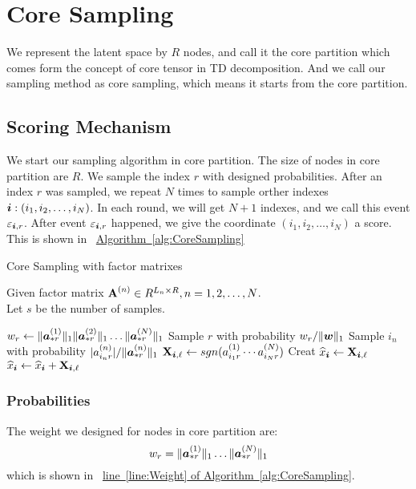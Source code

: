 \documentclass[letterpaper]{article}
\newcommand{\Sca}[3]{{#1}^{(#2)}_{i_#2#3}}%
\newcommand{\V}[1]{{\bm{{\MakeLowercase{#1}}}}}
\newcommand{\VnC}[3]{\V{#1}^{(#2)}_{#3}}
\newcommand{\Nrocl}[2]{\norm{\VnC{a}{#1}{*#2}}{1}}
\newcommand{\Vacol}[1]{\V{a}^{(#1)}_{*r}}
\newcommand{\M}[1]{{\bm{\mathbf{\MakeUppercase{#1}}}}}
\newcommand{\norm}[2]{\|#1\|_{#2}}
\newcommand{\Alg}[1] {\hyperref[alg:#1] {Algorithm~\ref*{alg:#1}}}
\newcommand{\AlgLine}[2]{\hyperref[alg:#1]{line~\ref*{line:#2} of Algorithm~\ref*{alg:#1}}}
\newcommand{\Coord}{(i_1,i_2,\ldots,i_N)}
\newcommand{\WreightR}{\Nrocl{1}{r}\ldots\Nrocl{N}{r}}
\begin{document}
\section{Core Sampling}
We represent the latent space by $R$ nodes, 
and call it the core partition which comes form the concept of core tensor in TD decomposition.
And we call our sampling method as core sampling, which means it starts from the core partition.

\subsection{Scoring Mechanism}

We start our sampling algorithm in core partition.
The size of nodes in core partition are $R$.
We sample the index $r$ with designed probabilities.
After an index $r$ was sampled, we repeat $N$ times to sample orther indexes $\V{i}:\Coord$.
In each round, we will get $N+1$ indexes, and we call this event $\varepsilon_{\V{i},r}$.
After event $\varepsilon_{\V{i},r}$ happened, we give the coordinate $\Coord$ a score.
This is shown in ~\Alg{CoreSampling}

\begin{algorithm}[t]
    \caption{Core Sampling with factor matrixes}
    \label{alg:CoreSampling}
    Given factor matrix $\M{A}^{(n)}\in R^{L_n\times R}, n = 1,2,\ldots,N$.\\
    Let $s$ be the number of samples.
    \begin{algorithmic}[1]
    \State $w_r \leftarrow \Nrocl{1}{r}\norm{\Vacol{2}}{1}\ldots\Nrocl{N}{r}$
    \label{line:Weight}
    \EndFor
    \State Sample $r$ with probability $w_r/\norm{\V{W}}{1}$
    \label{line:CorePartition}
    \label{line:ItemPartitionFor}
    \State Sample $i_n$ with probability $|\Sca{a}{n}{r}|/\norm{\Vacol{n}}{1}$
    \EndFor
    \label{line:ItemPartitionEnd}
    \State 
    \label{line:Scoring}
        $\M{X}_{\V{i},\ell} \leftarrow sgn(\Sca{a}{1}{r}\cdots\Sca{a}{N}{r})$
    \If {$\V{i}=\Coord$ has not been sampled}
    \State  Creat $\widehat{x}_{\V{i}} \leftarrow \M{X}_{\V{i},\ell} $
    \Else
    \State $\widehat{x}_{\V{i}} \leftarrow \widehat{x}_{\V{i}} + \M{X}_{\V{i},\ell}$
    \EndIf
    \EndFor
    \label{line:ScoringEnd}
    \end{algorithmic}
\end{algorithm}

\subsubsection{Probabilities}
The weight we designed for nodes in core partition are:
\[
    w_r = \WreightR
\]
which is shown in ~\AlgLine{CoreSampling}{Weight}.
\end{document}

